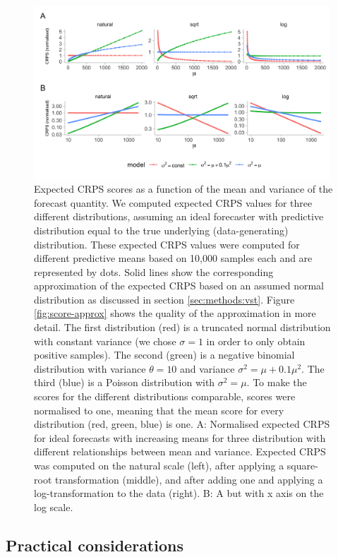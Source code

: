 \documentclass{article}
\begin{document}
\begin{figure}[h!]
    \centering
    \includegraphics[width=0.99\textwidth]{output/figures/SIM-mean-state-size.png}
    \caption{Expected CRPS scores as a function of the mean and variance of the forecast quantity. We computed expected CRPS values  for three different distributions, assuming an ideal forecaster with predictive distribution equal to the true underlying (data-generating) distribution. 
    These expected CRPS values were computed for different predictive means based on 10,000 samples each and are represented by dots. Solid lines show the corresponding approximation of the expected CRPS based on an assumed normal distribution as discussed in section \ref{sec:methods:vst}. Figure \ref{fig:score-approx} shows the quality of the approximation in more detail. 
    The first distribution (red) is a truncated normal distribution with constant variance (we chose $\sigma = 1$ in order to only obtain positive samples). The second (green) is a negative binomial distribution with variance $\theta = 10$ and variance $\sigma^2 = \mu + 0.1\mu^2$. The third (blue) is a
    Poisson distribution with $\sigma^2 = \mu$. To make the scores for the different distributions comparable, scores were normalised to one, meaning that the mean score for every distribution (red, green, blue) is one. 
    A: Normalised expected CRPS for ideal forecasts with increasing means for three distribution with different relationships between mean and variance. Expected CRPS was computed on the natural scale (left), after applying a square-root transformation (middle), and after adding one and applying a log-transformation to the data (right). B: A but with x axis on the log scale.}
    \label{fig:SIM-wis-state-size-mean}
\end{figure}

\subsection{Practical considerations}
\label{sec:methods:considerations}
\end{document}
